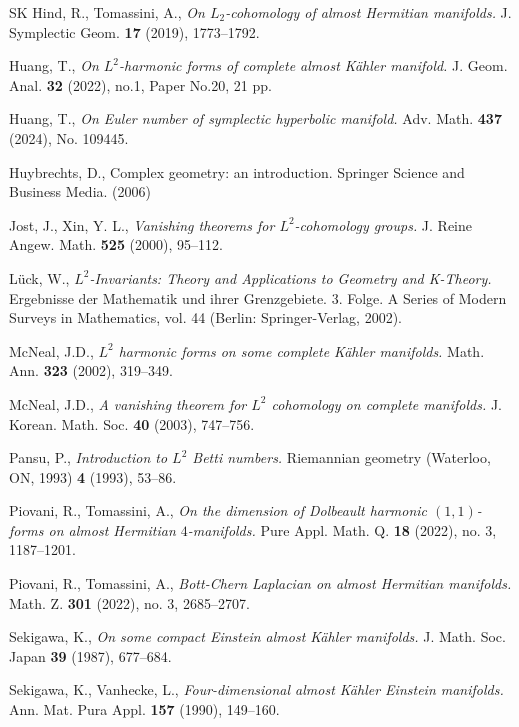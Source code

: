\documentclass[12pt, twoside]{article}
\theoremstyle{definition}
\numberwithin{equation}{section}
\begin{document}
\begin{thebibliography}{SK}
		Hind, R., Tomassini, A.,
		\textit{ On $L_{2}$-cohomology of almost Hermitian manifolds.} 
		J. Symplectic Geom. \textbf{17} (2019), 1773--1792.
		
	
		
		Huang, T.,
		\textit{ On $L^{2}$-harmonic forms of complete almost K\"{a}hler manifold.}
		J. Geom. Anal. \textbf{32} (2022), no.1, Paper No.20, 21 pp.
		
		Huang, T.,
		\textit{On Euler number of symplectic hyperbolic manifold.}
		Adv. Math.  \textbf{437} (2024), No. 109445.
		
		Huybrechts, D.,
		Complex geometry: an introduction.
		Springer Science and Business Media. (2006)
		
		Jost, J., Xin, Y. L.,
		\textit{Vanishing theorems for $L^{2}$-cohomology groups.} 
		J. Reine Angew. Math. \textbf{525} (2000), 95--112.
		
		Lück, W.,
		\textit{$L^{2}$-Invariants: Theory and Applications to Geometry and K-Theory.} 
		Ergebnisse der Mathematik und ihrer Grenzgebiete. 3. Folge. A Series of Modern Surveys in Mathematics, vol. 44 (Berlin: Springer-Verlag, 2002). 
		
		McNeal, J.D.,
		\textit{$L^{2}$ harmonic forms on some complete K\"{a}hler manifolds.}
		Math. Ann. \textbf{323} (2002), 319--349.
		
		McNeal, J.D.,
		\textit{A vanishing theorem for $L^{2}$ cohomology on complete manifolds.}
		J. Korean. Math. Soc. \textbf{40} (2003), 747--756.
		
		Pansu, P., 
		\textit{Introduction to $L^{2}$ Betti numbers.}
		Riemannian geometry (Waterloo, ON, 1993) \textbf{4} (1993), 53--86.
		
		Piovani, R., Tomassini, A.,
		\textit{On the dimension of Dolbeault harmonic $(1,1)$-forms on almost Hermitian $4$-manifolds.}
		Pure Appl. Math. Q. \textbf{18} (2022), no. 3, 1187--1201.
		
		Piovani, R., Tomassini, A.,
		\textit{Bott-Chern Laplacian on almost Hermitian manifolds.}
		Math. Z. \textbf{301} (2022), no. 3, 2685--2707.
		
		
		Sekigawa, K.,
		\textit{On some compact Einstein almost K\"{a}hler manifolds.}
		J. Math. Soc. Japan \textbf{39} (1987), 677--684.
		
		Sekigawa, K., Vanhecke, L.,
		\textit{Four-dimensional almost K\"{a}hler Einstein manifolds.}
		Ann. Mat. Pura Appl. \textbf{157} (1990), 149--160.
		

\end{thebibliography}
\end{document}
